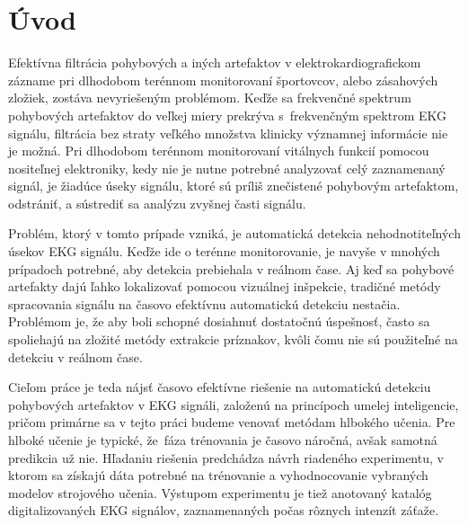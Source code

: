 \chapter*{Úvod}
\setcounter{page}{1}

Efektívna filtrácia pohybových a iných artefaktov v elektrokardiografickom zázname pri dlhodobom terénnom monitorovaní športovcov, alebo zásahových zložiek, zostáva nevyriešeným problémom. Keďže sa frekvenčné spektrum pohybových artefaktov do veľkej miery prekrýva s~frekvenčným spektrom EKG signálu, filtrácia bez straty veľkého množstva klinicky významnej informácie nie je možná. Pri dlhodobom terénnom monitorovaní vitálnych funkcií pomocou nositeľnej elektroniky, kedy nie je nutne potrebné analyzovať celý zaznamenaný signál, je žiadúce úseky signálu, ktoré sú príliš znečistené pohybovým artefaktom, odstrániť, a sústrediť sa analýzu zvyšnej časti signálu. 

Problém, ktorý v tomto prípade vzniká, je automatická detekcia nehodnotiteľných úsekov EKG signálu. Keďže ide o terénne monitorovanie, je navyše v mnohých prípadoch potrebné, aby detekcia prebiehala v reálnom čase. Aj keď sa pohybové artefakty dajú ľahko lokalizovať pomocou vizuálnej inšpekcie, tradičné metódy spracovania signálu na časovo efektívnu automatickú detekciu nestačia. Problémom je, že aby boli schopné dosiahnuť dostatočnú úspešnosť, často sa spoliehajú na zložité metódy extrakcie príznakov, kvôli čomu nie sú použiteľné na detekciu v reálnom čase. 

Cieľom práce je teda nájsť časovo efektívne riešenie na automatickú detekciu pohybových artefaktov v EKG signáli, založenú na princípoch umelej inteligencie, pričom primárne sa v tejto práci budeme venovať metódam hlbokého učenia. Pre hlboké učenie je typické, že~fáza trénovania je časovo náročná, avšak samotná predikcia už nie. Hľadaniu riešenia predchádza návrh riadeného experimentu, v ktorom sa získajú dáta potrebné na trénovanie a vyhodnocovanie vybraných modelov strojového učenia. Výstupom experimentu je tiež anotovaný katalóg digitalizovaných EKG signálov, zaznamenaných počas rôznych intenzít záťaže.




